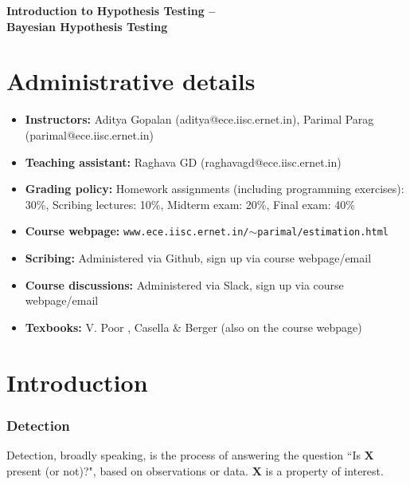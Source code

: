 \documentclass[12pt]{report}
\begin{document}
\maketitle

\begin{center}
{\Large \bf Introduction to Hypothesis Testing --\\ Bayesian Hypothesis Testing}
\end{center}


\section{Administrative details}
\begin{itemize}
\item {\bf Instructors:} Aditya Gopalan (aditya@ece.iisc.ernet.in), Parimal Parag (parimal@ece.iisc.ernet.in)
\item {\bf Teaching assistant:} Raghava GD (raghavagd@ece.iisc.ernet.in)
\item {\bf Grading policy:} Homework assignments (including programming exercises): 30\%, Scribing lectures: 10\%, Midterm exam: 20\%, Final exam: 40\%
\item {\bf Course webpage:} {\tt www.ece.iisc.ernet.in/$\sim$parimal/estimation.html}
\item {\bf Scribing:} Administered via Github, sign up via course webpage/email
\item {\bf Course discussions:} Administered via Slack, sign up via course webpage/email
\item {\bf Texbooks:} V. Poor \cite{Poor}, Casella \& Berger \cite{CaseBerg:01} (also on the course webpage)
\end{itemize}

\section{Introduction}
\subsubsection{Detection}
Detection, broadly speaking, is the process of answering the question ``Is $\mathbf{X}$ present (or not)?", based on observations or data. $\mathbf{X}$ is a property of interest. \\
\end{document}
